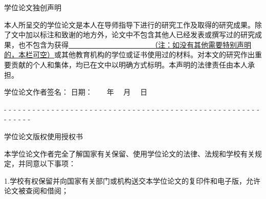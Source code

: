 \begin{titlepage}

    \begin{spacing}{1.5}
        
    \vspace{24pt}
    \begin{center}
        \heiti 学位论文独创声明
    \end{center}
    \vspace{18pt}
    
    {
    本人所呈交的学位论文是本人在导师指导下进行的研究工作及取得的研究成果。除了文中加以标注和致谢的地方外，论文中不包含其他人已经发表或撰写过的研究成果，也不包含为获得\underline{~~~~~~~~~~~~~~~~~~~~~~~（注：如没有其他需要特别声明的，本栏可空）}或其他教育机构的学位或证书使用过的材料。对本文的研究作出重要贡献的个人和集体，均已在文中以明确方式标明。本声明的法律责任由本人承担。
    
    \hspace*{1em}
    
    \hspace*{1em}
    
    学位论文作者签名：\hspace{160pt} 日期：~~~~年 ~~月 ~~日
    
    \begin{center}
        \textrm - - - - - - - - - - - - - - - - - - - - - - - - - - - - - - - - - - - - - - - - - - - - - - - - - - - - - - - - - - - -
    \end{center}
    }
    
    \vspace{24pt}
    \begin{center}
        \heiti 学位论文版权使用授权书
    \end{center}
    \vspace{18pt}
    
    {
    本学位论文作者完全了解国家有关保留、使用学位论文的法律、法规和学校有关规定，并同意以下事项：
    
    1.学校有权保留并向国家有关部门或机构送交本学位论文的复印件和电子版，允许论文被查阅和借阅；
    
}
\end{spacing}
\end{titlepage}
